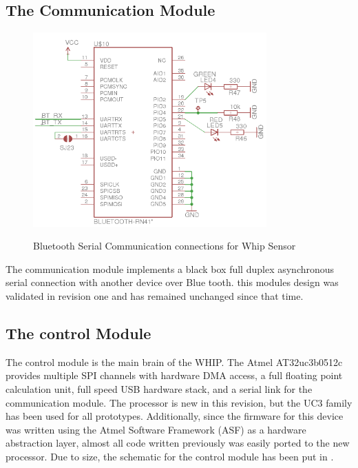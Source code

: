 \subsection{The Communication Module}
\begin{figure}
	\begin{center}
		\label{fig:Rev5_BT}
		\includegraphics[scale=1,width=0.8\textwidth]{Images/Rev5_BT.png} 
		\caption{Bluetooth Serial Communication connections for Whip Sensor}
	\end{center}
\end{figure}
The communication module implements a black box full duplex asynchronous serial connection with another device over Blue tooth. this modules design was validated in revision one and has remained unchanged since that time. 

\subsection{The control Module}
The control module is the main brain of the WHIP. The Atmel AT32uc3b0512c provides multiple SPI channels with hardware DMA access, a full floating point calculation unit, full speed USB hardware stack, and a serial link for the communication module. The processor is new in this revision, but the UC3 family has been used for all prototypes. Additionally, since the firmware for this device was written using the Atmel Software Framework (ASF) as a hardware abstraction layer, almost all code written previously was easily ported to the new processor. Due to size, the schematic for the control module has been put in .

